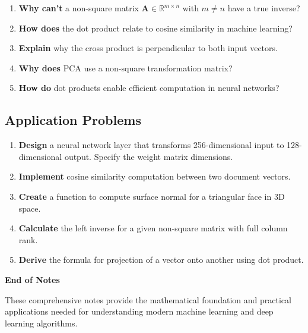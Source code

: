 \documentclass[12pt,a4paper]{article}
\theoremstyle{definition}
\begin{document}
\begin{enumerate}[resume]
\item \textbf{Why can't} a non-square matrix $\mathbf{A} \in \mathbb{R}^{m \times n}$ with $m \neq n$ have a true inverse?

\item \textbf{How does} the dot product relate to cosine similarity in machine learning?

\item \textbf{Explain} why the cross product is perpendicular to both input vectors.

\item \textbf{Why does} PCA use a non-square transformation matrix?

\item \textbf{How do} dot products enable efficient computation in neural networks?
\end{enumerate}

\subsection{Application Problems}

\begin{enumerate}[resume]
\item \textbf{Design} a neural network layer that transforms 256-dimensional input to 128-dimensional output. Specify the weight matrix dimensions.

\item \textbf{Implement} cosine similarity computation between two document vectors.

\item \textbf{Create} a function to compute surface normal for a triangular face in 3D space.

\item \textbf{Calculate} the left inverse for a given non-square matrix with full column rank.

\item \textbf{Derive} the formula for projection of a vector onto another using dot product.
\end{enumerate}

\vspace{1cm}
\begin{center}
\textbf{End of Notes}

\vspace{0.5cm}
These comprehensive notes provide the mathematical foundation and practical applications needed for understanding modern machine learning and deep learning algorithms.
\end{center}
\end{document}
